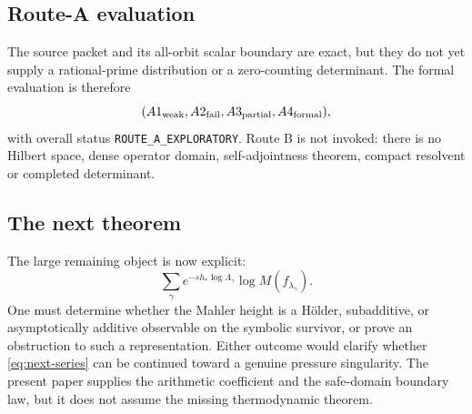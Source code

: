 \subsection{Route-A evaluation}

The source packet and its all-orbit scalar boundary are exact, but they do
not yet supply a rational-prime distribution or a zero-counting determinant.
The formal evaluation is therefore
\[
 (A1_{\rm weak},A2_{\rm fail},A3_{\rm partial},A4_{\rm formal}),
\]
with overall status \texttt{ROUTE\_A\_EXPLORATORY}.  Route B is not invoked:
there is no Hilbert space, dense operator domain, self-adjointness theorem,
compact resolvent or completed determinant.

\subsection{The next theorem}

The large remaining object is now explicit:
\begin{equation}
 \sum_\gamma e^{-s h_*\log\Lambda_\gamma}
 \log M(f_{\lambda_\gamma}).
 \label{eq:next-series}
\end{equation}
One must determine whether the Mahler height is a H\"older, subadditive, or
asymptotically additive observable on the symbolic survivor, or prove an
obstruction to such a representation.  Either outcome would clarify whether
\eqref{eq:next-series} can be continued toward a genuine pressure
singularity.  The present paper supplies the arithmetic coefficient and the
safe-domain boundary law, but it does not assume the missing thermodynamic
theorem.
